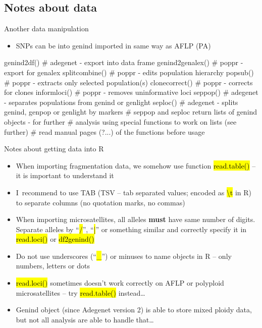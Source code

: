 \documentclass[compress, ucs, xelatex, 11pt, xcolor=svgnames,
  hyperref={
    bookmarks=true,
    unicode=true,
    colorlinks=true,
    pdftitle={Molecular data in R},
    plainpages=false,
    pdfauthor={Vojtech Zeisek},
    pdfsubject={Course about phylogeny and evolution in R},
    pdfcreator={XeLaTeX},
    pdfkeywords={R, evolution, phylogeny, molecular data},
    linkcolor=Tomato,
    anchorcolor=SaddleBrown,
    citecolor=Goldenrod,
    filecolor=DarkMagenta,
    menucolor=Sienna,
    urlcolor=DarkTurquoise,
    pdftex},
  url={hyphens, lowtilde} %
  ]{beamer}
\renewcommand{\texttt}[1]{\hl{\ttfamily #1}}
\begin{document}
\subsection{Notes about data}

\begin{frame}[fragile]{Another data manipulation}
  \begin{itemize}
    \item SNPs can be into genind imported in same way as AFLP (PA)
  \end{itemize}
  \begin{spluscode}
    genind2df() # adegenet - export into data frame
    genind2genalex() # poppr - export for genalex
    splitcombine() # poppr - edits population hierarchy
    popsub() # poppr - extracts only selected population(s)
    clonecorrect() # poppr - corrects for clones
    informloci() # poppr - removes uninformative loci
    seppop() # adegenet - separates populations from genind or genlight
    seploc() # adegenet - splits genind, genpop or genlight by markers
    # seppop and seploc return lists of genind objects - for further
    # analysis using special functions to work on lists (see further)
    # read manual pages (?...) of the functions before usage
  \end{spluscode}
\end{frame}

\begin{frame}{Notes about getting data into R}
\begin{itemize}
 \item When importing fragmentation data, we somehow use function \texttt{read.table()} -- it is important to understand it
 \item I~recommend to use TAB (TSV -- tab separated values; encoded as \texttt{\textbackslash t} in R) to separate columns (no quotation marks, no commas)
 \item When importing microsatellites, all alleles \textbf{must} have same number of digits. Separate alleles by ``\texttt{/}'', ``\texttt{|}'' or something similar and correctly specify it in \texttt{read.loci()} or \texttt{df2genind()}
 \item Do not use underscores (``\texttt{\_}'') or minuses to name objects in R -- only numbers, letters or dots
 \item \texttt{read.loci()} sometimes doesn't work correctly on AFLP or polyploid microsatellites -- try \texttt{read.table()} instead\ldots
 \item Genind object (since Adegenet version 2) is able to store mixed ploidy data, but not all analysis are able to handle that\ldots
\end{itemize}
\end{frame}
\end{document}
